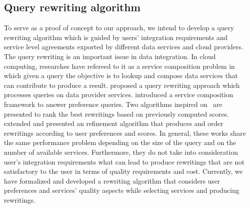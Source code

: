 
\subsection{Query rewriting algorithm}
To serve as a proof of concept to our approach, we intend to develop a query rewriting algorithm which is guided by users' integration requirements and service level agreements exported by different data services and cloud providers. The query rewriting is an important issue in data integration. In cloud computing, researches have refereed to it as a service composition problem in which given a query the objective is to lookup and compose data services that can contribute to produce a result. \cite{Barhamgi2010} proposed a query rewriting approach which processes queries on data provider services. \cite{Benouaret2011} introduced a service composition framework to answer preference queries. Two algorithms inspired on~\cite{Barhamgi2010} are presented to rank the best rewritings based on previously computed scores. \cite{ba2014} extended \cite{Umberto} and presented an refinement algorithm that produces and order rewritings according to user preferences and scores. In general, these works share the same performance problem depending on the size of the query and on the number of available services. Furthermore, they do not take into consideration user's integration requirements what can lead to produce rewritings that are not satisfactory to the user in terms of quality requirements and cost. Currently, we have formalized and developed a rewriting algorithm that considers user preferences and services' quality aspects while selecting services and producing rewritings. 